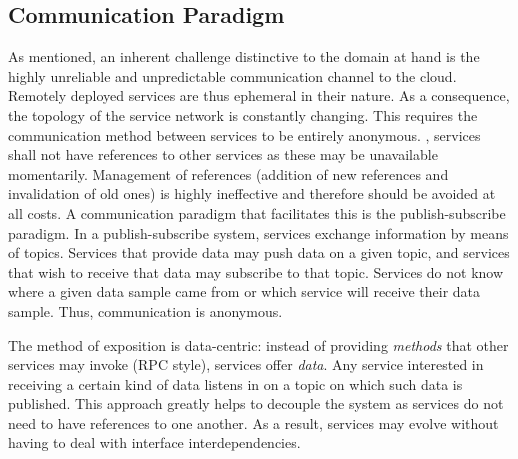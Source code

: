 \subsection{Communication Paradigm}
As mentioned, an inherent challenge distinctive to the domain at hand is the highly unreliable and unpredictable communication channel to the cloud. Remotely deployed services are thus ephemeral in their nature. As a consequence, the topology of the service network is constantly changing. This requires the communication method between services to be entirely anonymous. \Ie , services shall not have references to other services as these may be unavailable momentarily. Management of references (addition of new references and invalidation of old ones) is highly ineffective and therefore should be avoided at all costs. A communication paradigm that facilitates this is the publish-subscribe paradigm. In a publish-subscribe system, services exchange information by means of topics. Services that provide data may push data on a given topic, and services that wish to receive that data may subscribe to that topic. Services do not know where a given data sample came from or which service will receive their data sample. Thus, communication is anonymous.


The method of exposition is data-centric: instead of providing \emph{methods} that other services may invoke (RPC style), services offer \emph{data}. Any service interested in receiving a certain kind of data listens in on a topic on which such data is published. This approach greatly helps to decouple the system as services do not need to have references to one another. As a result, services may evolve without having to deal with interface interdependencies.


